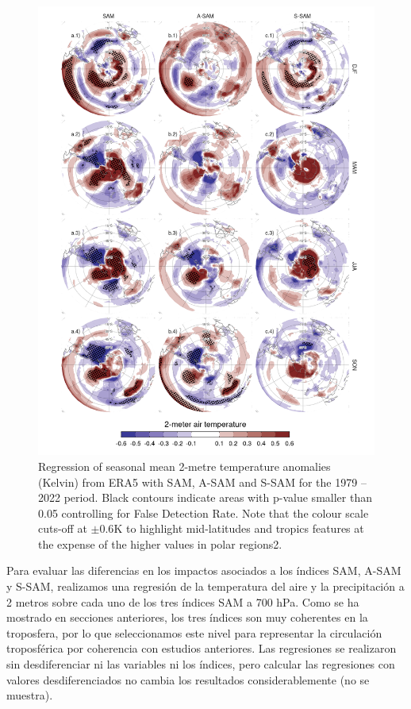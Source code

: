 \documentclass[12pt,oneside]{reedthesis}
\begin{document}
\begin{figure}
\includegraphics{figures/30-sam/regr-air-season-1} \caption{Regression of seasonal mean 2-metre temperature anomalies (Kelvin) from ERA5 with SAM, A-SAM and S-SAM for the 1979 -- 2022 period. Black contours indicate areas with p-value smaller than 0.05 controlling for False Detection Rate. Note that the colour scale cuts-off at \(\pm0.6 \mathrm{K}\) to highlight mid-latitudes and tropics features at the expense of the higher values in polar regions2.}\label{fig:regr-air-season}
\end{figure}

Para evaluar las diferencias en los impactos asociados a los índices SAM, A-SAM y S-SAM, realizamos una regresión de la temperatura del aire y la precipitación a 2 metros sobre cada uno de los tres índices SAM a 700 hPa.
Como se ha mostrado en secciones anteriores, los tres índices son muy coherentes en la troposfera, por lo que seleccionamos este nivel para representar la circulación troposférica por coherencia con estudios anteriores.
Las regresiones se realizaron sin desdiferenciar ni las variables ni los índices, pero calcular las regresiones con valores desdiferenciados no cambia los resultados considerablemente (no se muestra).
\end{document}

